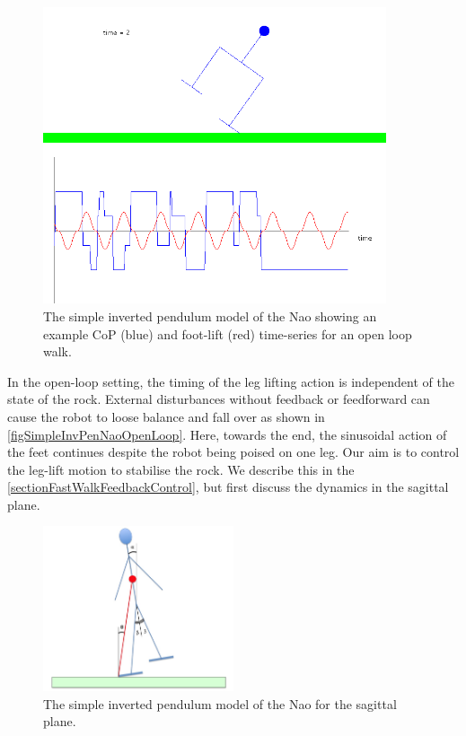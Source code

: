 \documentclass[pdftex,11pt,a4paper]{report}
\begin{document}
\begin{figure}[ht]
\centering
\includegraphics[width=0.9\textwidth]{figures/SimpleInvPenNaoOpenLoop}
\caption{The simple inverted pendulum model of the Nao showing an example CoP (blue) and foot-lift (red) time-series for an open loop walk.} \label{figSimpleInvPenNaoOpenLoop}
\end{figure}

In the open-loop setting, the timing of the leg lifting action is independent of the state of the rock. External disturbances without feedback or feedforward can cause the robot to loose balance and fall over as shown in \autoref{figSimpleInvPenNaoOpenLoop}. Here, towards the end, the sinusoidal action of  the feet continues despite the robot being poised on one leg. Our aim is to control the leg-lift motion to stabilise the rock. We describe this in the \autoref{sectionFastWalkFeedbackControl}, but first discuss the dynamics in the sagittal plane. 

\begin{figure}[ht]
\centering
\includegraphics[width=0.5\textwidth]{figures/FastwalkSagittalMotion.jpg}
\caption{The simple inverted pendulum model of the Nao for the sagittal plane.} \label{figFastwalkSagittalMotion}
\end{figure}
\end{document}
